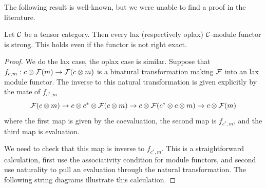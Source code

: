 \documentclass{amsart}
\begin{document}
The following result is well-known, but we were unable to find a proof in the literature. 

\begin{lemma} \label{lem:laxisstrong}
	Let $\mathcal C$ be a tensor category. Then every lax (respectively oplax) $\mathcal C$-module functor is strong. This holds even if the functor is not right exact.   
\end{lemma} 

\begin{proof}
We do the lax case, the oplax case is similar.  Suppose that $f_{c,m}:  c \otimes \mathcal F(m) \rightarrow \mathcal F(c \otimes m)$ is a binatural transformation making $\mathcal F$ into an lax module functor.  The inverse to this natural transformation is given explicitly by the mate of $f_{c^*,m}$ 
$$\mathcal F(c \otimes m) \rightarrow c \otimes c^* \otimes \mathcal F(c \otimes m) \rightarrow c \otimes \mathcal F(c^* \otimes c \otimes m) \rightarrow c \otimes \mathcal F(m)$$
where the first map is given by the coevaluation, the second map is $f_{c^*,m}$, and the third map is evaluation.
\begin{center}
\end{center} 
We need to check that this map is inverse to $f_{c^*,m}$.  This is a straightforward calculation, first use the associativity condition for module functors, and second use naturality to pull an evaluation through the natural transformation.  The following string diagrams illustrate this calculation.


\end{proof}
\end{document}
